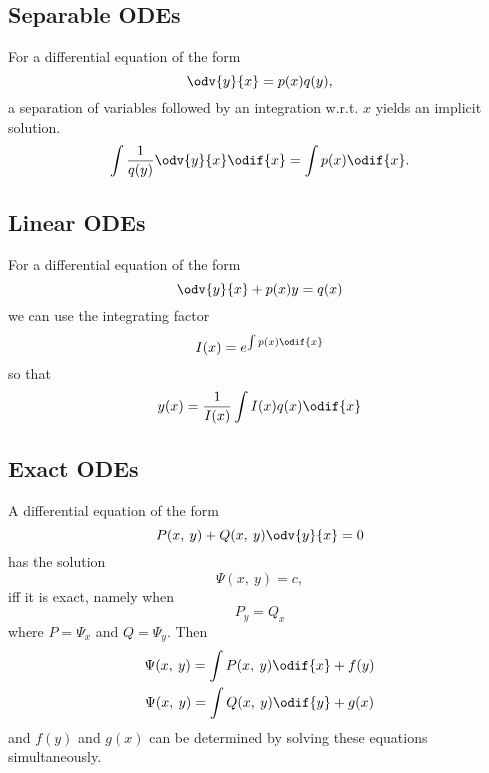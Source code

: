 \documentclass{article}
\begin{document}
\subsection{Separable ODEs}
For a differential equation of the form
\begin{equation*}
    \odv{y}{x} = p(x) q(y),
\end{equation*}
a separation of variables followed by an integration w.r.t. \(x\) yields an implicit solution.
\begin{equation*}
    \int \frac{1}{q(y)} \odv{y}{x} \odif{x} = \int p(x) \odif{x}.
\end{equation*}
\subsection{Linear ODEs}
For a differential equation of the form
\begin{equation*}
    \odv{y}{x} + p(x)y = q(x)
\end{equation*}
we can use the integrating factor
\begin{equation*}
    I(x) = e^{\int p(x) \odif{x}}
\end{equation*}
so that
\begin{equation*}
    y(x) = \frac{1}{I(x)} \int I(x) q(x) \odif{x}
\end{equation*}
\subsection{Exact ODEs}
A differential equation of the form
\begin{equation*}
    P(x,\: y) + Q(x,\: y)\odv{y}{x} = 0
\end{equation*}
has the solution
\begin{equation*}
    \Psi(x,\: y) = c,
\end{equation*}
iff it is exact, namely when
\begin{equation*}
    P_y = Q_x
\end{equation*}
where \(P = \Psi_x\) and \(Q = \Psi_y\). Then
\begin{gather*}
    \Psi(x,\: y) = \int P(x,\: y) \odif{x} + f(y) \\
    \Psi(x,\: y) = \int Q(x,\: y) \odif{y} + g(x)
\end{gather*}
and \(f(y)\) and \(g(x)\) can be determined by solving these equations simultaneously.
\newpage
\end{document}
